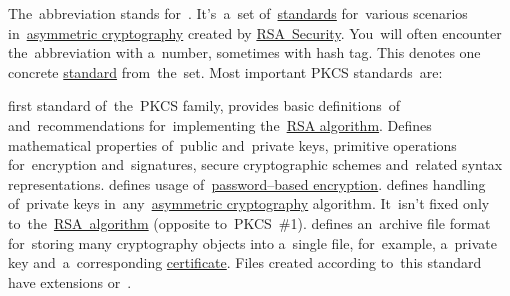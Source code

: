 The~abbreviation stands for~.
It's~a~set of~\hyperref[protocolstandard]{standards} for~various scenarios in~\hyperref[asymmetriccryptography]{asymmetric cryptography} created by \href{https://en.wikipedia.org/wiki/RSA_Security}{RSA~Security}.
You~will often encounter the~abbreviation with a~number, sometimes with hash tag.
This denotes one concrete \hyperref[protocolstandard]{standard} from~the~set.
Most important PKCS standards~are:
\begin{itemize}
     first standard of~the~PKCS family, provides basic definitions~of and~recommendations for~implementing the~\hyperref[rsa]{RSA algorithm}.
             Defines mathematical properties of~public and~private keys, primitive operations for~encryption and~signatures, secure cryptographic schemes and~related syntax representations.
     defines usage of~\hyperref[keypassword]{password--based encryption}.
     defines handling of~private keys in~any~\hyperref[asymmetriccryptography]{asymmetric cryptography} algorithm.
             It~isn't fixed only to~the~\hyperref[rsa]{RSA~algorithm} (opposite to~PKCS~\#1).
     defines an~archive file format for~storing many cryptography objects into a~single file, for~example, a~private key and~a~corresponding \hyperref[certificate]{certificate}.
             Files created according to~this standard have extensions  or~.
\end{itemize}
